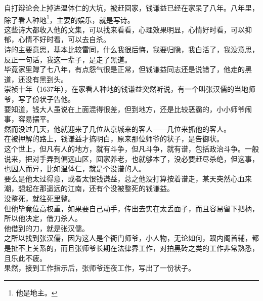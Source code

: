 \begin{multicols}{\theparacolNo}
自打辩论会上掉进温体仁的大坑，被赶回家，钱谦益已经在家呆了八年。八年里，除了看人种地\footnote{他是地主。}，主要的娱乐，就是写诗。\\

这些诗大都收入他的文集，可以找来看看，心理效果明显，心情好时看，可以抑郁，心情不好时看，可以去自杀。\\

诗的主要意思，基本比较雷同，什么我很后悔，我要归隐，我白活了，我没意思，反正一句话，我这一辈子，是走了黑道。\\

毕竟家里蹲了七八年，有点怨气很是正常，但钱谦益同志还是说错了，他走的黑道，还没有黑到头。\\

崇祯十年（1637年），在家看人种地的钱谦益突然听说，有一个叫张汉儒的当地师爷，写了份状子告他。\\

要知道，钱大人虽说在上面混得很差，但到地方，还是比较恶霸的，小小师爷闹事，容易摆平。\\

然而没过几天，他就迎来了几位从京城来的客人——几位来抓他的客人。\\

在被押解的路上，钱谦益才搞明白，原来那位师爷的状子，是告御状。\\

这个世上，但凡有人的地方，就有斗争，但凡斗争，就有谱，包括政治斗争。一般说来，把对手弄到偏远山区，回家养老，也就够本了，没必要赶尽杀绝，但这事，也因人而异，比如温体仁，就是个没谱的人。\\

要么是他太过得意，或者太恨钱谦益，总之他没打算按着谱走，某天突然心血来潮，想起在那遥远的江南，还有个没被整死的钱谦益。\\

没整死，就往死里整。\\

但他毕竟位高权重，如果要自己动手，传出去实在太丢面子，而且容易留下把柄，所以他决定，借刀杀人。\\

他借到的刀，就是张汉儒。\\

之所以找到张汉儒，因为这人是个衙门师爷，小人物，无论如何，跟内阁首辅，都是扯不上关系的，而且张师爷长期在法律界工作，对拍黑砖之类的工作非常熟悉，且乐此不疲。\\

果然，接到工作指示后，张师爷连夜工作，写出了一份状子。\\


\end{multicols}
